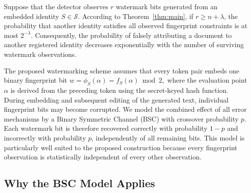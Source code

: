 \documentclass[a4paper,11pt]{llncs}
\begin{document}

Suppose that the detector observes $r$ watermark bits generated from an
embedded identity $S\in\mathcal S$.
According to Theorem~\ref{thm:main}, if $r\ge n+\lambda$, the probability
that another identity satisfies all observed fingerprint constraints is
at most $2^{-\lambda}$. Consequently, the probability of falsely
attributing a document to another registered identity decreases
exponentially with the number of surviving watermark observations.


The proposed watermarking scheme assumes that every token pair embeds one
binary fingerprint bit
$w=\phi_S(\alpha)=f_S(\alpha)\bmod2,$
where the evaluation point $\alpha$ is derived from the preceding token
using the secret-keyed hash function.
During embedding and subsequent editing of the generated text, individual
fingerprint bits may become corrupted. We model the combined effect of
all error mechanisms by a Binary Symmetric Channel (BSC) with crossover
probability $p$. Each watermark bit is therefore recovered correctly
with probability $1-p$ and incorrectly with probability $p$,
independently of all remaining bits.
This model is particularly well suited to the proposed construction
because every fingerprint observation is statistically independent of
every other observation.

\subsection{Why the BSC Model Applies}
\end{document}
